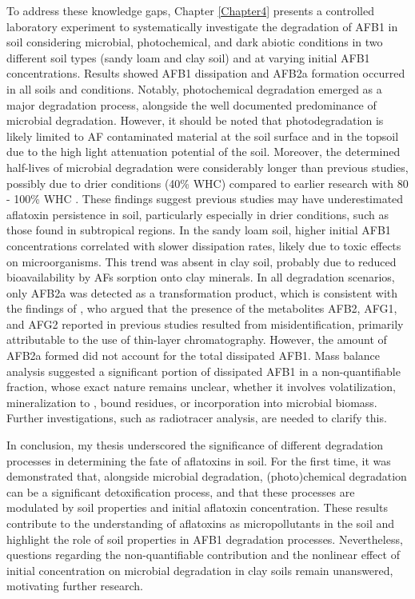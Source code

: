 To address these knowledge gaps, Chapter \ref{Chapter4} presents a controlled laboratory experiment to systematically investigate the degradation of AFB1 in soil considering microbial, photochemical, and dark abiotic conditions in two different soil types (sandy loam and clay soil) and at varying initial AFB1 concentrations. Results showed AFB1 dissipation and AFB2a formation occurred in all soils and conditions. Notably, photochemical degradation emerged as a major degradation process, alongside the well documented predominance of microbial degradation. However, it should be noted that photodegradation is likely limited to AF contaminated material at the soil surface and in the topsoil due to the high light attenuation potential of the soil. Moreover, the determined half-lives of microbial degradation were considerably longer than previous studies, possibly due to drier conditions (40\% WHC) compared to earlier research with 80 - 100\% WHC \citep{accinelli2008aspergillus, angle1980decomposition, angle1986aflatoxin}. These findings suggest previous studies may have underestimated aflatoxin persistence in soil, particularly especially in drier conditions, such as those found in subtropical regions. In the sandy loam soil, higher initial AFB1 concentrations correlated with slower dissipation rates, likely due to toxic effects on microorganisms. This trend was absent in clay soil, probably due to reduced bioavailability by AFs sorption onto clay minerals. In all degradation scenarios, only AFB2a was detected as a transformation product, which is consistent with the findings of \citet{starr2017solvent}, who argued that the presence of the metabolites AFB2, AFG1, and AFG2 reported in previous studies \citep{angle1980decomposition, angle1986aflatoxin} resulted from misidentification, primarily attributable to the use of thin-layer chromatography. However, the amount of AFB2a formed did not account for the total dissipated AFB1. Mass balance analysis suggested a significant portion of dissipated AFB1 in a non-quantifiable fraction, whose exact nature remains unclear, whether it involves volatilization, mineralization to , bound residues, or incorporation into microbial biomass. Further investigations, such as radiotracer analysis, are needed to clarify this. 


In conclusion, my thesis underscored the significance of different degradation processes in determining the fate of aflatoxins in soil. For the first time, it was demonstrated that, alongside microbial degradation, (photo)chemical degradation can be a significant detoxification process, and that these processes are modulated by soil properties and initial aflatoxin concentration. These results contribute to the understanding of aflatoxins as micropollutants in the soil and highlight the role of soil properties in AFB1 degradation processes. Nevertheless, questions regarding the non-quantifiable contribution and the nonlinear effect of initial concentration on microbial degradation in clay soils remain unanswered, motivating further research.

